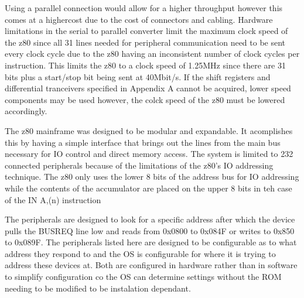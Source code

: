 \documentclass{book}
\begin{document}
Using a parallel connection would allow for a higher throughput however this comes at a highercost due to the cost of connectors and cabling. Hardware limitations in the serial to parallel converter limit the maximum clock speed of the z80 since all 31 lines needed for peripheral communication need to be sent every clock cycle due to the z80 having an inconsistent number of clock cycles per instruction. This limits the z80 to a clock speed of 1.25MHz since there are 31 bits plus a start/stop bit being sent at 40Mbit/s. If the shift registers and differential tranceivers specified in Appendix A cannot be acquired, lower speed components may be used however, the colck speed of the z80 must be lowered accordingly.

The z80 mainframe was designed to be modular and expandable. It acomplishes this by having a simple interface that brings out the lines from the main bus necessary for IO control and direct memory access. The system is limited to 232 connected peripherals because of the limitations of the z80's IO addressing technique. The z80 only uses the lower 8 bits of the address bus for IO addressing while the contents of the accumulator are placed on the upper 8 bits in teh case of  the IN A,(n) instruction\cite[p.~295]{zlg:z80}

The peripherals  are designed to look for a specific address after which the device pulls the BUSREQ line low and reads from 0x0800 to 0x084F or writes to 0x850 to 0x089F. The peripherals listed here are designed to be configurable as to what address they respond to and the OS is configurable for where it is trying to address these devices at. Both are configured in hardware rather than in software to simplify configuration co the OS can determine settings without the ROM needing to be modified to be instalation dependant.
\end{document}
